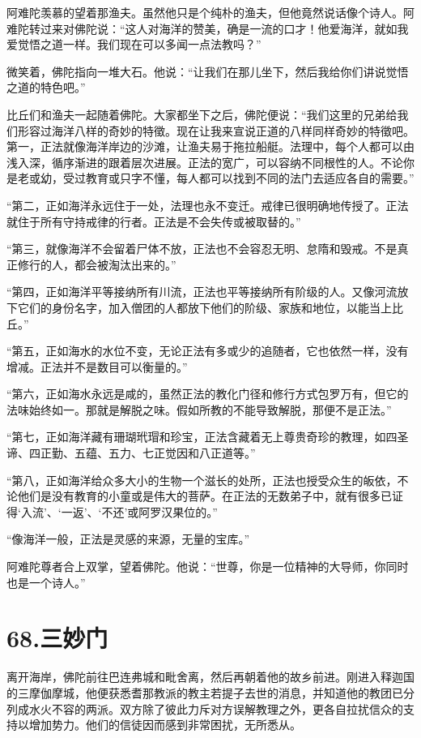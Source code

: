 \documentclass[12pt,twoside,openany]{book}
\begin{document}
阿难陀羡慕的望着那渔夫。虽然他只是个纯朴的渔夫，但他竟然说话像个诗人。阿难陀转过来对佛陀说：“这人对海洋的赞美，确是一流的口才！他爱海洋，就如我爱觉悟之道一样。我们现在可以多闻一点法教吗？”

微笑着，佛陀指向一堆大石。他说：“让我们在那儿坐下，然后我给你们讲说觉悟之道的特色吧。”

比丘们和渔夫一起随着佛陀。大家都坐下之后，佛陀便说：“我们这里的兄弟给我们形容过海洋八样的奇妙的特徵。现在让我来宣说正道的八样同样奇妙的特徵吧。第一，正法就像海洋岸边的沙滩，让渔夫易于拖拉船艇。法理中，每个人都可以由浅入深，循序渐进的跟着层次进展。正法的宽广，可以容纳不同根性的人。不论你是老或幼，受过教育或只字不懂，每人都可以找到不同的法门去适应各自的需要。”

“第二，正如海洋永远住于一处，法理也永不变迁。戒律已很明确地传授了。正法就住于所有守持戒律的行者。正法是不会失传或被取替的。”

“第三，就像海洋不会留着尸体不放，正法也不会容忍无明、怠隋和毁戒。不是真正修行的人，都会被淘汰出来的。”

“第四，正如海洋平等接纳所有川流，正法也平等接纳所有阶级的人。又像河流放下它们的身份名字，加入僧团的人都放下他们的阶级、家族和地位，以能当上比丘。”

“第五，正如海水的水位不变，无论正法有多或少的追随者，它也依然一样，没有增减。正法并不是数目可以衡量的。”

“第六，正如海水永远是咸的，虽然正法的教化门径和修行方式包罗万有，但它的法味始终如一。那就是解脱之味。假如所教的不能导致解脱，那便不是正法。”

“第七，正如海洋藏有珊瑚玳瑁和珍宝，正法含藏着无上尊贵奇珍的教理，如四圣谛、四正勤、五蕴、五力、七正觉因和八正道等。”

“第八，正如海洋给众多大小的生物一个滋长的处所，正法也授受众生的皈依，不论他们是没有教育的小童或是伟大的菩萨。在正法的无数弟子中，就有很多已证得‘入流’、‘一返’、‘不还’或阿罗汉果位的。”

“像海洋一般，正法是灵感的来源，无量的宝库。”

阿难陀尊者合上双掌，望着佛陀。他说：“世尊，你是一位精神的大导师，你同时也是一个诗人。”


\chapter{68.三妙门}\label{ch68}

离开海岸，佛陀前往巴连弗城和毗舍离，然后再朝着他的故乡前进。刚进入释迦国的三摩伽摩城，他便获悉耆那教派的教主若提子去世的消息，并知道他的教团已分列成水火不容的两派。双方除了彼此力斥对方误解教理之外，更各自拉扰信众的支持以增加势力。他们的信徒因而感到非常困扰，无所悉从。
\end{document}
